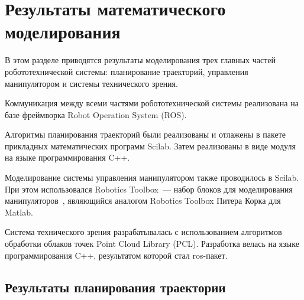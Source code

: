 \section{Результаты математического моделирования}

В этом разделе приводятся результаты моделирования трех главных частей робототехнической системы: планирование траекторий, управления манипулятором и системы технического зрения.

Коммуникация между всеми частями робототехнической системы реализована на базе фреймворка Robot Operation System (ROS).

Алгоритмы планирования траекторий были реализованы и отлажены в пакете прикладных математических программ Scilab. Затем реализованы в виде модуля на языке программирования C++.

Моделирование системы управления манипулятором также проводилось в Scilab. При этом использовался Robotics Toolbox~--- набор блоков для моделирования манипуляторов~\cite{roboticstoolbox}, являющийся аналогом Robotics Toolbox Питера Корка для Matlab.

Система технического зрения разрабатывалась с использованием алгоритмов обработки облаков точек Point Cloud Library (PCL). Разработка велась на языке программирования C++, результатом которой стал ros-пакет.


\subsection{Результаты планирования траектории}

